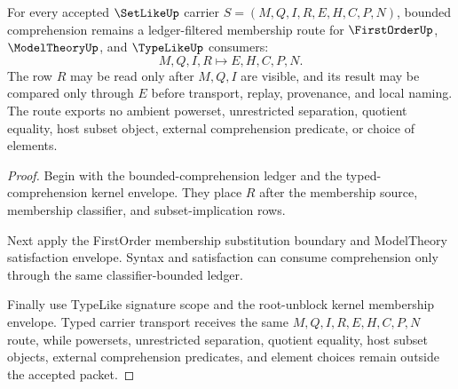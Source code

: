 \begin{theorem}
\label{thm:setlike-root-comprehension-ledger-triple}
For every accepted $\SetLikeUp$ carrier $S=(M,Q,I,R,E,H,C,P,N)$, bounded comprehension remains a ledger-filtered membership route for $\FirstOrderUp$, $\ModelTheoryUp$, and $\TypeLikeUp$ consumers:
$$
M,Q,I,R \longmapsto E,H,C,P,N .
$$
The row $R$ may be read only after $M,Q,I$ are visible, and its result may be compared only through $E$ before transport, replay, provenance, and local naming. The route exports no ambient powerset, unrestricted separation, quotient equality, host subset object, external comprehension predicate, or choice of elements.
\end{theorem}
\begin{proof}
Begin with the bounded-comprehension ledger and the typed-comprehension kernel envelope. They place $R$ after the membership source, membership classifier, and subset-implication rows.

Next apply the FirstOrder membership substitution boundary and ModelTheory satisfaction envelope. Syntax and satisfaction can consume comprehension only through the same classifier-bounded ledger.

Finally use TypeLike signature scope and the root-unblock kernel membership envelope. Typed carrier transport receives the same $M,Q,I,R,E,H,C,P,N$ route, while powersets, unrestricted separation, quotient equality, host subset objects, external comprehension predicates, and element choices remain outside the accepted packet.
\end{proof}

